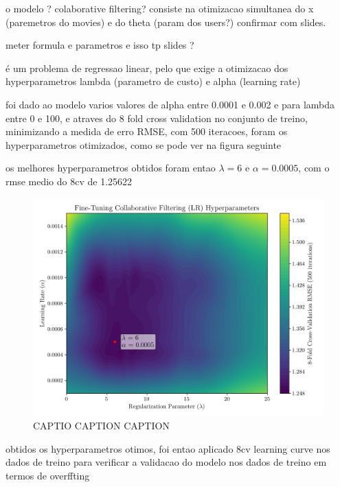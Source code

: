 \documentclass[conference]{IEEEtran}
\begin{document}
o modelo ? colaborative filtering? consiste na otimizacao simultanea do x (paremetros do movies) e do theta (param dos users?) confirmar  com slides.

meter formula e parametros e isso tp slides ?

é um problema de regressao linear, pelo que exige a otimizacao dos hyperparametros lambda (parametro de custo) e alpha (learning rate)

foi dado ao modelo varios valores de alpha entre 0.0001 e 0.002 e para lambda entre 0 e 100, e atraves do 8 fold cross validation no conjunto de treino, minimizando a medida de erro RMSE, com 500 iteracoes, foram os hyperparametros otimizados, como se pode ver na figura seguinte

os melhores hyperparametros obtidos foram entao $\lambda = 6$ e $\alpha = 0.0005$, com o rmse medio do 8cv de 1.25622

\begin{figure}[H]
    \centering
    \includegraphics[width=1\linewidth]{assets/model01_hyperparametres.png}
    \caption{CAPTIO CAPTION CAPTION}
    \label{fig:model01_hyperparametres}
\end{figure}

obtidos os hyperparametros otimos, foi entao aplicado 8cv learning curve nos dados de treino para verificar a validacao do modelo nos dados de treino em termos de overffting
\end{document}
